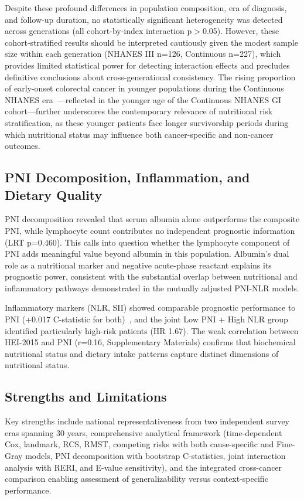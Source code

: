 \documentclass[review]{elsarticle}
\begin{document}
Despite these profound differences in population composition, era of diagnosis, and follow-up duration, no statistically significant heterogeneity was detected across generations (all cohort-by-index interaction p$>$0.05). However, these cohort-stratified results should be interpreted cautiously given the modest sample size within each generation (NHANES III n=126, Continuous n=227), which provides limited statistical power for detecting interaction effects and precludes definitive conclusions about cross-generational consistency. The rising proportion of early-onset colorectal cancer in younger populations during the Continuous NHANES era~\cite{kapala2025}---reflected in the younger age of the Continuous NHANES GI cohort---further underscores the contemporary relevance of nutritional risk stratification, as these younger patients face longer survivorship periods during which nutritional status may influence both cancer-specific and non-cancer outcomes.

\subsection{PNI Decomposition, Inflammation, and Dietary Quality}

PNI decomposition revealed that serum albumin alone outperforms the composite PNI, while lymphocyte count contributes no independent prognostic information (LRT p=0.460). This calls into question whether the lymphocyte component of PNI adds meaningful value beyond albumin in this population. Albumin's dual role as a nutritional marker and negative acute-phase reactant explains its prognostic power, consistent with the substantial overlap between nutritional and inflammatory pathways demonstrated in the mutually adjusted PNI-NLR models.

Inflammatory markers (NLR, SII) showed comparable prognostic performance to PNI (+0.017 C-statistic for both)~\cite{templeton2014}, and the joint Low PNI + High NLR group identified particularly high-risk patients (HR 1.67). The weak correlation between HEI-2015 and PNI (r=0.16, Supplementary Materials) confirms that biochemical nutritional status and dietary intake patterns capture distinct dimensions of nutritional status.

\subsection{Strengths and Limitations}

Key strengths include national representativeness from two independent survey eras spanning 30 years, comprehensive analytical framework (time-dependent Cox, landmark, RCS, RMST, competing risks with both cause-specific and Fine-Gray models, PNI decomposition with bootstrap C-statistics, joint interaction analysis with RERI, and E-value sensitivity), and the integrated cross-cancer comparison enabling assessment of generalizability versus context-specific performance.
\end{document}
